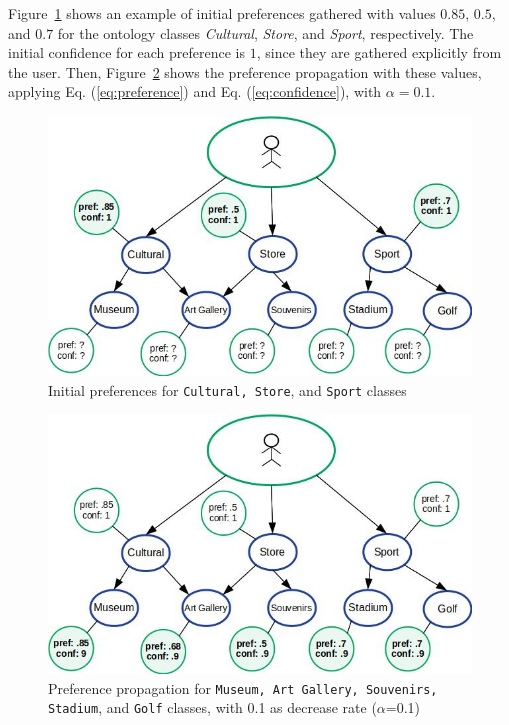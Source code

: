 Figure~\ref{fig:initial_pref} shows an example of initial preferences gathered with values $0.85$, $0.5$, and $0.7$ for the 
ontology classes \textit{Cultural}, \textit{Store}, and \textit{Sport}, respectively. The initial confidence for each preference is $1$, since they are gathered explicitly from the user. Then, Figure~\ref{fig:pref_prop} shows the preference propagation with these values, applying Eq. (\ref{eq:preference}) and Eq. (\ref{eq:confidence}), with $\alpha = 0.1$.

\begin{figure}[h]
\centering
\includegraphics[scale=0.5]{draws/initial_pref.jpg}
\caption{Initial preferences for {\tt Cultural, Store}, and {\tt Sport} classes}
\label{fig:initial_pref}
\end{figure}

\begin{figure}[h]
\centering
\includegraphics[scale=0.5]{draws/pref_spred.jpg}
\caption{Preference propagation for {\tt Museum, Art Gallery, Souvenirs, Stadium}, and {\tt Golf} classes, with 0.1 as decrease rate ($\alpha$=0.1)}
\label{fig:pref_prop}
\end{figure}

